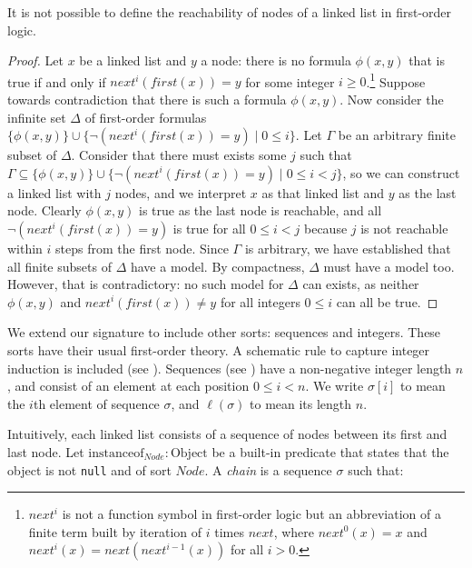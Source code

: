 \documentclass[runningheads]{llncs}
\theoremstyle{remark}
\begin{document}
\begin{proposition}
It is not possible to define the reachability of nodes of a linked list in first-order logic.
\end{proposition}
\begin{proof}
Let $x$ be a linked list and $y$ a node: there is no formula $\phi(x,y)$ that is true if and only if $\mathit{next}^i(\mathit{first}(x))=y$ for some integer $i\geq 0$.\footnote{$\mathit{next}^i$ is not a function symbol in first-order logic but an abbreviation of a finite term built by iteration of $i$ times $\mathit{next}$, where $\mathit{next}^0(x)=x$ and $\mathit{next}^i(x)=next(\mathit{next}^{i-1}(x))$ for all $i>0$.}
Suppose towards contradiction that there is such a formula $\phi(x,y)$.
Now consider the infinite set $\Delta$ of first-order formulas $\{\phi(x,y)\}\cup\{\lnot(\mathit{next}^i(\mathit{first}(x))=y)\mid 0\leq i\}$. Let $\Gamma$ be an arbitrary finite subset of $\Delta$. Consider that there must exists some $j$ such that $\Gamma\subseteq \{\phi(x,y)\}\cup\{\lnot(\mathit{next}^i(\mathit{first}(x))=y)\mid 0\leq i<j\}$, so we can construct a linked list with $j$ nodes, and we interpret $x$ as that linked list and $y$ as the last node. Clearly $\phi(x,y)$ is true as the last node is reachable, and all $\lnot(\mathit{next}^i(\mathit{first}(x))=y)$ is true for all $0\leq i<j$ because $j$ is not reachable within $i$ steps from the first node. Since $\Gamma$ is arbitrary, we have established that all finite subsets of $\Delta$ have a model. By compactness, $\Delta$ must have a model too. However, that is contradictory: no such model for $\Delta$ can exists, as neither $\phi(x,y)$ and $\mathit{next}^i(\mathit{first}(x))\neq y$ for all integers $0\leq i$ can all be true.
\end{proof}

We extend our signature to include other sorts: sequences and integers. These sorts have their usual first-order theory. A schematic rule to capture integer induction is included (see \cite[Section 2.4.2]{KeYbook}). Sequences (see \cite[Chapter 5.2]{KeYbook}) have a non-negative integer length $n$, and consist of an element at each position $0\leq i<n$. We write $\sigma[i]$ to mean the $i$th element of sequence $\sigma$, and $\ell(\sigma)$ to mean its length $n$.

Intuitively, each linked list consists of a sequence of nodes between its first and last node. Let $\mathrm{instanceof}_\mathit{Node}: \mathrm{Object}$ be a built-in predicate that states that the object is not \texttt{null} and of sort $\mathit{Node}$. A \emph{chain} is a sequence $\sigma$ such that:
\end{document}
